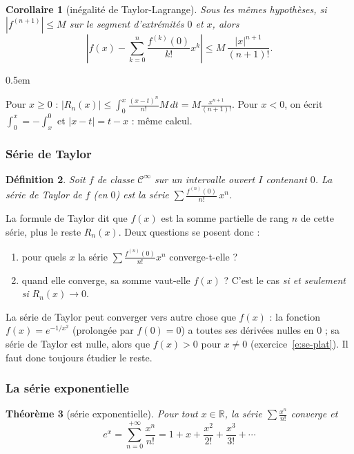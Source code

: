 \documentclass[a4paper,11pt]{article}
\makeatletter
\numberwithin{equation}{section}
\numberwithin{figure}{section}
\numberwithin{table}{section}
\theoremstyle{enonce}
\newtheorem{definition}{Définition}[section]
\newtheorem{theoreme}[definition]{Théorème}
\newtheorem{corollaire}[definition]{Corollaire}
\theoremstyle{exemple}
\theoremstyle{remarque}
\renewcommand{\proofname}{Démonstration}
\renewenvironment{proof}[1][\proofname]{\par\pushQED{\qed}\normalfont
  \topsep0.5em\relax\trivlist\item[\hskip\labelsep\sffamily\itshape\color{Gris}#1.]\ignorespaces}
  {\popQED\endtrivlist\@endpefalse}
\newcommand{\R}{\mathbb{R}}
\makeatother
\begin{document}
\begin{corollaire}[inégalité de Taylor-Lagrange]\label{c:tl}
Sous les mêmes hypothèses, si $|f^{(n+1)}|\leq M$ sur le segment d'extrémités $0$ et $x$, alors
\[\left|f(x)-\sum_{k=0}^n\frac{f^{(k)}(0)}{k!}x^k\right|\leq M\,\frac{|x|^{n+1}}{(n+1)!}.\]
\end{corollaire}

\begin{proof}
Pour $x\geq0$ : $|R_n(x)|\leq\int_0^x\frac{(x-t)^n}{n!}M\,dt=M\frac{x^{n+1}}{(n+1)!}$. Pour $x<0$, on écrit $\int_0^x=-\int_x^0$ et
$|x-t|=t-x$ : même calcul.
\end{proof}

\subsubsection*{Série de Taylor}

\begin{definition}
Soit $f$ de classe $\mathcal C^\infty$ sur un intervalle ouvert $I$ contenant $0$. La \emph{série de Taylor} de $f$ (en $0$)
est la série $\displaystyle\sum\frac{f^{(n)}(0)}{n!}\,x^n$.
\end{definition}

La formule de Taylor dit que $f(x)$ est la somme partielle de rang $n$ de cette série, plus le reste $R_n(x)$. Deux questions
se posent donc :
\begin{enumerate}
\item pour quels $x$ la série $\sum\frac{f^{(n)}(0)}{n!}x^n$ converge-t-elle ?
\item quand elle converge, sa somme vaut-elle $f(x)$ ? C'est le cas \emph{si et seulement si} $R_n(x)\to0$.
\end{enumerate}

\begin{attention}
La série de Taylor peut converger vers autre chose que $f(x)$ : la fonction $f(x)=e^{-1/x^2}$ (prolongée par $f(0)=0$) a toutes
ses dérivées nulles en $0$ ; sa série de Taylor est nulle, alors que $f(x)>0$ pour $x\neq0$ (exercice~\ref{e:se-plat}). Il faut
donc toujours étudier le reste.
\end{attention}

\subsubsection*{La série exponentielle}

\begin{theoreme}[série exponentielle]\label{t:exp}
Pour tout $x\in\R$, la série $\sum\frac{x^n}{n!}$ converge et
\[e^x=\sum_{n=0}^{+\infty}\frac{x^n}{n!}=1+x+\frac{x^2}{2!}+\frac{x^3}{3!}+\cdots\]
\end{theoreme}
\end{document}
